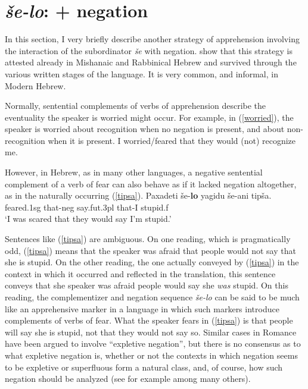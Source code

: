 \documentclass[output=paper,colorlinks,citecolor=brown]{langscibook}
\begin{document}
\section{\textit{še-lo}:  + negation}
\label{sec:se-lo}
In this section, I very briefly describe another strategy of apprehension involving the interaction of the subordinator \textit{še } with negation. \citet{rubinsteinetal} show that this strategy is attested already in Mishanaic and Rabbinical Hebrew and survived through the various written stages of the language. It is very common, and informal, in Modern Hebrew.

Normally, sentential complements of verbs of apprehension describe the eventuality the speaker is worried might occur. For example, in (\ref{worried}), the speaker is worried about recognition when no negation is present, and about non-recognition when it is present. 
\ea
I worried/feared  that they would (not) recognize me. \label{worried}
\z

However, in Hebrew, as in many other languages, a negative sentential complement of a verb of fear can also behave as if it lacked negation altogether, as in the naturally occurring (\ref{tipsa}).
\ea
\label{tipsa}
\gll Paxadeti še-\textbf{lo} yagidu še-ani tipša. \\
feared.{\sc 1sg} that-{\sc neg} say.{\sc fut.3pl} that-I stupid.{\sc f} \\
\glt `I was scared that they would say I'm stupid.'
\z

Sentences like (\ref{tipsa}) are ambiguous. On one reading, which is pragmatically odd, (\ref{tipsa}) means that the speaker was afraid that people would not say that she is stupid. On the other reading, the one actually conveyed by (\ref{tipsa}) in the context in which it occurred and reflected in the translation, this sentence conveys that she speaker was afraid people would say she \textit{was} stupid. On this reading, the complementizer and negation sequence \textit{še-lo} can be said to be much like an apprehensive marker in a language in which such markers introduce complements of verbs of fear. What the speaker fears in (\ref{tipsa}) is that people will say she is stupid, not that they would not say so. Similar cases in Romance have been argued to involve ``expletive negation'', but there is no consensus as to what expletive negation is, whether or not  the contexts in which negation seems to be expletive or superfluous form a natural class, and, of course, how such negation should be analyzed (see for example \citealt{vanderwurff99, abels05, eilam09, yoon11, makri13, puskas17, dobrushina21} among many others).
\end{document}
